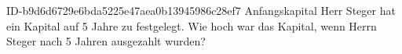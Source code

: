 \begin{exercise}
      {ID-b9d6d6729e6bda5225e47aea0b13945986c28ef7}
      {Anfangskapital}
  \ifproblem\problem
    Herr Steger hat ein Kapital auf \num{5} Jahre zu  festgelegt.
    Wie hoch war das Kapital, wenn Herrn Steger nach \num{5} Jahren 
    ausgezahlt wurden?
  \fi
\end{exercise}
